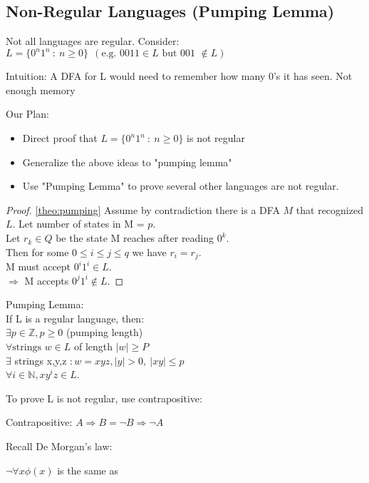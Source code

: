 \newpage
\subsection{Non-Regular Languages (Pumping Lemma)}
Not all languages are regular. Consider:
$L = \{ 0^n 1^n \: : \: n \geq 0 \} \:\:(\text{e.g. 0011} \in L \text{ but 001 } \notin L)$
\begin{theorem} \label{theo:pumping}
  Intuition: A DFA for L would need to remember how many 0's it has seen. Not enough memory
\end{theorem}
Our Plan:
\begin{itemize}
  \item Direct proof that $L = \{ 0^n 1^n \: : \: n \geq 0 \}$ is not regular
  \item Generalize the above ideas to "pumping lemma"
  \item Use "Pumping Lemma" to prove several other languages are not regular.
\end{itemize}
\begin{proof} \ref{theo:pumping}
  Assume by contradiction there is a DFA $M$ that recognized $L$. Let number of states in M = $p$.
  \\ Let $r_k \in Q$ be the state M reaches after reading $0^k$.
  \\ Then for some $0 \leq i \leq j \leq q$ we have $r_i = r_j$. 
  \\ M must accept $0^i 1^i \in L$.
  \\ $\Rightarrow$ M accepts $0^j 1^i \notin L$.
\end{proof}

\begin{lemma}
  Pumping Lemma:
  \\ If L is a regular language, then:
  \\ $\exists p \in \mathbb{Z}, p \geq 0$ (pumping length)
  \\ $\forall \text{strings }w \in L$ of length $|w| \geq P$
  \\ $\exists$ strings x,y,z $: w = xyz, |y| > 0, \: |xy| \leq p$
  \\ $\forall i \in \mathbb{N}, xy^iz \in L$.
\end{lemma}

To prove L is not regular, use contrapositive:
\begin{definition} \label{def:contrapositive}
  Contrapositive: $A \Rightarrow B = \neg B \Rightarrow \neg A$
\end{definition}
Recall De Morgan's law:
\begin{definition} \label{def:demorgan}
  $\neg \forall x \phi(x)$ is the same as
\end{definition}


